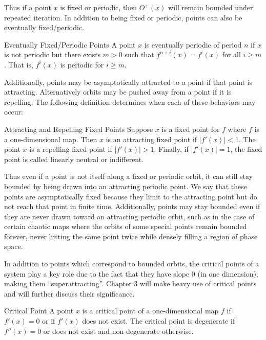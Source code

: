 Thus if a point $x$ is fixed or periodic, then $O^+ (x)$ will remain bounded under repeated iteration. In addition to being fixed or periodic, points can also be eventually fixed/periodic.

\begin{mydef}{Eventually Fixed/Periodic Points\cite{Dev1}}
	A point $x$ is eventually periodic of period $n$ if $x$ is not periodic but there exists $m>0$ such that $f^{n+i} (x) = f^i (x)$ for all $i \geq m$. That is, $f^i (x)$ is periodic for $i \geq m$.
\end{mydef}

Additionally, points may be asymptotically attracted to a point if that point is attracting. Alternatively orbits may be pushed away from a point if it is repelling. The following definition determines when each of these behaviors may occur:

\begin{mydef}{Attracting and Repelling Fixed Points\cite{Dev1}}
	Suppose $x$ is a fixed point for $f$ where $f$ is a one-dimensional map. Then $x$ is an attracting fixed point if $|f' (x) | < 1$. The point $x$ is a repelling fixed point if $|f' (x)| > 1$. Finally, if $|f' (x)| = 1$, the fixed point is called linearly neutral or indifferent.
\end{mydef}

Thus even if a point is not itself along a fixed or periodic orbit, it can still stay bounded by being drawn into an attracting periodic point. We say that these points are asymptotically fixed because they limit to the attracting point but do not reach that point in finite time. Additionally, points may stay bounded even if they are never drawn toward an attracting periodic orbit, such as in the case of certain chaotic maps where the orbits of some special points remain bounded forever, never hitting the same point twice while densely filling a region of phase space.

In addition to points which correspond to bounded orbits, the critical points of a system play a key role due to the fact that they have slope 0 (in one dimension), making them ``superattracting''. Chapter 3 will make heavy use of critical points and will further discuss their significance.

\begin{mydef}{Critical Point \cite{Dev2}}
	A point $x$ is a critical point of a one-dimensional map $f$ if $f' (x) =0$ or if $f' (x)$ does not exist. The critical point is degenerate if $f'' (x)  = 0$ or does not exist and non-degenerate otherwise.
\end{mydef}

